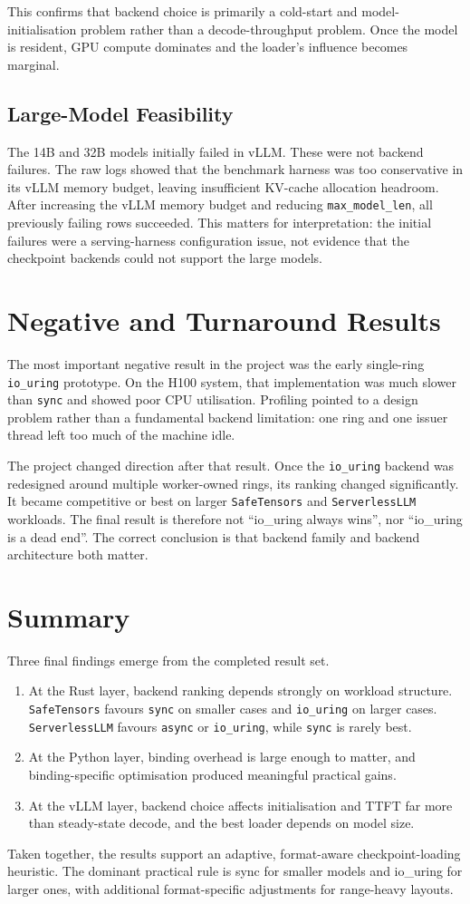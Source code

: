 This confirms that backend choice is primarily a cold-start and model-initialisation problem rather than a decode-throughput problem. Once the model is resident, GPU compute dominates and the loader's influence becomes marginal.

\subsection{Large-Model Feasibility}

The 14B and 32B models initially failed in vLLM. These were not backend failures. The raw logs showed that the benchmark harness was too conservative in its vLLM memory budget, leaving insufficient KV-cache allocation headroom. After increasing the vLLM memory budget and reducing \texttt{max\_model\_len}, all previously failing rows succeeded. This matters for interpretation: the initial failures were a serving-harness configuration issue, not evidence that the checkpoint backends could not support the large models.

\section{Negative and Turnaround Results}

The most important negative result in the project was the early single-ring \texttt{io\_uring} prototype. On the H100 system, that implementation was much slower than \texttt{sync} and showed poor CPU utilisation. Profiling pointed to a design problem rather than a fundamental backend limitation: one ring and one issuer thread left too much of the machine idle.

The project changed direction after that result. Once the \texttt{io\_uring} backend was redesigned around multiple worker-owned rings, its ranking changed significantly. It became competitive or best on larger \texttt{SafeTensors} and \texttt{ServerlessLLM} workloads. The final result is therefore not ``io\_uring always wins'', nor ``io\_uring is a dead end''. The correct conclusion is that backend family and backend architecture both matter.

\section{Summary}

Three final findings emerge from the completed result set.

\begin{enumerate}
\item At the Rust layer, backend ranking depends strongly on workload structure. \texttt{SafeTensors} favours \texttt{sync} on smaller cases and \texttt{io\_uring} on larger cases. \texttt{ServerlessLLM} favours \texttt{async} or \texttt{io\_uring}, while \texttt{sync} is rarely best.
\item At the Python layer, binding overhead is large enough to matter, and binding-specific optimisation produced meaningful practical gains.
\item At the vLLM layer, backend choice affects initialisation and TTFT far more than steady-state decode, and the best loader depends on model size.
\end{enumerate}

Taken together, the results support an adaptive, format-aware checkpoint-loading heuristic. The dominant practical rule is sync for smaller models and io\_uring for larger ones, with additional format-specific adjustments for range-heavy layouts.
